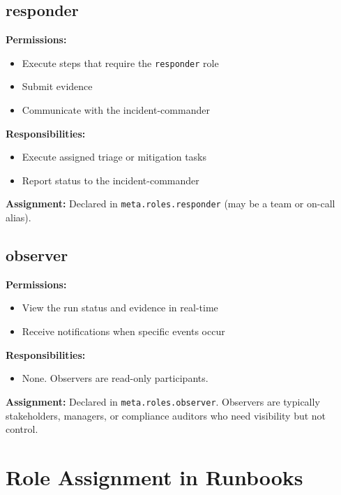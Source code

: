 \subsection{responder}

\textbf{Permissions:}
\begin{itemize}
  \item Execute steps that require the \texttt{responder} role
  \item Submit evidence
  \item Communicate with the incident-commander
\end{itemize}

\textbf{Responsibilities:}
\begin{itemize}
  \item Execute assigned triage or mitigation tasks
  \item Report status to the incident-commander
\end{itemize}

\textbf{Assignment:} Declared in \texttt{meta.roles.responder} (may be a team or on-call alias).

\subsection{observer}

\textbf{Permissions:}
\begin{itemize}
  \item View the run status and evidence in real-time
  \item Receive notifications when specific events occur
\end{itemize}

\textbf{Responsibilities:}
\begin{itemize}
  \item None. Observers are read-only participants.
\end{itemize}

\textbf{Assignment:} Declared in \texttt{meta.roles.observer}. Observers are typically stakeholders, managers, or compliance auditors who need visibility but not control.

\section{Role Assignment in Runbooks}

